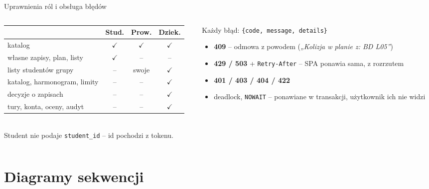\documentclass[aspectratio=169,11pt]{beamer}
\newcommand{\good}[1]{\textcolor{ok}{#1}}
\begin{document}
\begin{frame}{Uprawnienia ról i obsługa błędów}
  \begin{columns}[T]
    \begin{column}{0.5\textwidth}
      \footnotesize
      \begin{tabular}{@{}lccc@{}}
        \toprule
        & \textbf{Stud.} & \textbf{Prow.} & \textbf{Dziek.} \\
        \midrule
        katalog & \good{$\checkmark$} & \good{$\checkmark$} & \good{$\checkmark$} \\
        własne zapisy, plan, listy & \good{$\checkmark$} & -- & -- \\
        listy studentów grupy & -- & swoje & \good{$\checkmark$} \\
        katalog, harmonogram, limity & -- & -- & \good{$\checkmark$} \\
        decyzje o zapisach & -- & -- & \good{$\checkmark$} \\
        tury, konta, oceny, audyt & -- & -- & \good{$\checkmark$} \\
        \bottomrule
      \end{tabular}\\[6pt]
      Student nie podaje \texttt{student\_id} -- id pochodzi z tokenu.
    \end{column}
    \begin{column}{0.46\textwidth}
      \footnotesize
      Każdy błąd: \texttt{\{code, message, details\}}
      \begin{itemize}
        \item \textbf{409} -- odmowa z powodem (\emph{„Kolizja w planie z: BD L05''})
        \item \textbf{429 / 503} + \texttt{Retry-After} -- SPA ponawia sama, z rozrzutem
        \item \textbf{401 / 403 / 404 / 422}
        \item deadlock, \texttt{NOWAIT} -- ponawiane w transakcji, użytkownik ich nie widzi
      \end{itemize}
    \end{column}
  \end{columns}
\end{frame}

\section{Diagramy sekwencji}
\end{document}
